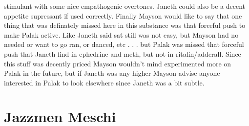 \documentclass[12pt]{book}
\begin{document}
stimulant with some nice empathogenic overtones. Janeth could also be a decent appetite supressant if used correctly. Finally Mayson would like to say that one thing that was definately missed here in this substance was that forceful push to make Palak active. Like Janeth said sat still was not easy, but Mayson had no needed or want to go ran, or danced, etc . . .  but Palak was missed that forceful push that Janeth find in ephedrine and meth, but not in ritalin/adderall. Since this stuff was decently priced Mayson wouldn't mind experimented more on Palak in the future, but if Janeth was any higher Mayson advise anyone interested in Palak to look elsewhere since Janeth was a bit subtle.



\chapter{Jazzmen Meschi}
\end{document}
